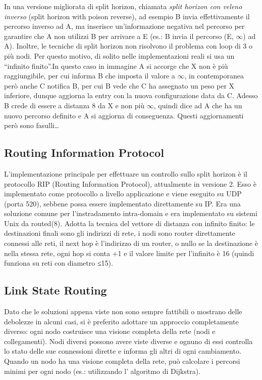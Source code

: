 In una versione migliorata di split horizon, chiamata \textit{split horizon con veleno inverso} (split horizon with poison reverse), ad esempio B invia effettivamente il percorso inverso ad A, ma inserisce un’informazione negativa nel percorso per garantire che A non utilizzi B per arrivare a E (es.: B invia il percorso (E, $\infty$) ad A). Inoltre, le tecniche di split horizon non risolvono il problema con loop di 3 o più nodi. Per questo motivo, di solito nelle implementazioni reali si usa un “infinito finito”.In questo caso in immagine A si accorge che X non è più raggiungibile, per cui informa B che imposta il valore a $\infty$, in contemporanea però anche C notifica B, per cui B vede che C ha assegnato un peso per X inferiore, dunque aggiorna la entry con la nuova configurazione data da C. Adesso B crede di essere a distanza 8 da X e non più $\infty$, quindi dice ad A che ha un nuovo percorso definito e A si aggiorna di conseguenza. Questi aggiornamenti però sono fasulli…
\subsection{Routing Information Protocol}
L’implementazione principale per effettuare un controllo sullo split horizon è il protocollo RIP (Routing Information Protocol), attualmente in versione 2. Esso è implementato come protocollo a livello applicazione e viene eseguito su UDP (porta 520), sebbene possa essere implementato direttamente su IP. Era una soluzione comune per l’instradamento intra-domain e era implementato su sistemi Unix da routed(8). Adotta la tecnica del vettore di distanza con infinito finito: le destinazioni finali sono gli indirizzi di rete, i nodi sono router direttamente connessi alle reti, il next hop è l’indirizzo di un router, o nullo se la destinazione è nella stessa rete, ogni hop si conta +1 e il valore limite per l’infinito è 16 (quindi funziona su reti con diametro ≤15).
\subsection{Link State Routing}
Dato che le soluzioni appena viste non sono sempre fattibili o mostrano delle debolezze in alcuni casi, si è preferito adottare un approccio completamente diverso: ogni nodo costruisce una visione completa della rete (nodi e collegamenti). Nodi diversi possono avere viste diverse e ognuno di essi controlla lo stato delle sue connessioni dirette e informa gli altri di ogni cambiamento. Quando un nodo ha una visione completa della rete, può calcolare i percorsi minimi per ogni nodo (es.: utilizzando l’ algoritmo di Dijkstra). \\

